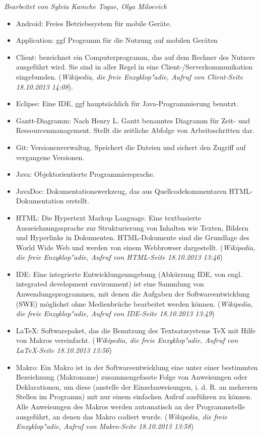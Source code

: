 \textit{Bearbeitet von Sylvia Kamche Togue, Olga Miloevich}
		
\begin{itemize}
\item Android: Freies Betriebssystem für mobile Geräte.
\item Application: ggf Programm für die Nutzung auf mobilen Geräten
\item Client: bezeichnet ein Computerprogramm, das auf dem Rechner des Nutzers ausgeführt wird. Sie sind in aller Regel in eine Client-/Serverkommunikation eingebunden. (\textit{Wikipedia, die freie Enzyklop"adie, Aufruf von Client-Seite 18.10.2013 14:08}).
\item Eclipse: Eine IDE, ggf hauptsächlich für Java-Programmierung benutzt.
\item Gantt-Diagramm: Nach Henry L. Gantt benanntes Diagramm für Zeit- und Ressourcenmanagement. Stellt die zeitliche Abfolge von Arbeitsschritten dar.
\item Git: Versionenverwaltug. Speichert die Dateien und sichert den Zugriff auf vergangene Versionen.
\item Java: Objektorientierte Programmiersprache.
\item JavaDoc: Dokumentationswerkzeug, das aus Quellcodekommentaren HTML-Dokumentation erstellt.
\item HTML: Die Hypertext Markup Language. Eine textbasierte Auszeichnungssprache zur Strukturierung von Inhalten wie Texten, Bildern und Hyperlinks in Dokumenten. HTML-Dokumente sind die Grundlage des World Wide Web und werden von einem Webbrowser dargestellt. (\textit{Wikipedia, die freie Enzyklop"adie, Aufruf von HTML-Seite 18.10.2013 13:46})
\item IDE: Eine integrierte Entwicklungsumgebung (Abkürzung IDE, von engl. integrated development environment) ist eine Sammlung von Anwendungsprogrammen, mit denen die Aufgaben der Softwareentwicklung (SWE) möglichst ohne Medienbrüche bearbeitet werden können.
(\textit{Wikipedia, die freie Enzyklop"adie, Aufruf von IDE-Seite 18.10.2013 13:49})
\item LaTeX: Softwarepaket, das die Benutzung des Textsatzsystems TeX mit Hilfe von Makros vereinfacht. (\textit{Wikipedia, die freie Enzyklop"adie, Aufruf von LaTeX-Seite 18.10.2013 13:56}) 
\item Makro: Ein Makro ist in der Softwareentwicklung eine unter einer bestimmten Bezeichnung (Makroname) zusammengefasste Folge von Anweisungen oder Deklarationen, um diese (anstelle der Einzelanweisungen, i. d. R. an mehreren Stellen im Programm) mit nur einem einfachen Aufruf ausführen zu können. Alle Anweisungen des Makros werden automatisch an der Programmstelle ausgeführt, an denen das Makro codiert wurde. (\textit{Wikipedia, die freie Enzyklop"adie, Aufruf von Makro-Seite 18.10.2013 13:58})

\end{itemize}
